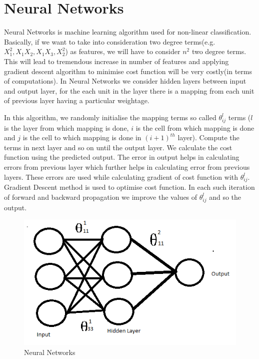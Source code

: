 \section{ Neural Networks}
\par Neural Networks is machine learning algorithm used for non-linear classification. Basically, if we want to take into consideration two degree terms(e.g. $X_{1}^{2},X_{1}X_{2},X_{1}X_{3},X_{2}^{2}$) as features, we will have to consider $n^{2}$ two degree terms. This will lead to tremendous increase in number of features and applying gradient descent algorithm to minimise cost function will be very costly(in terms of computations). In Neural Networks we consider hidden layers between input and output layer, for the each unit in the layer there is a mapping from each unit of previous layer having a particular weightage. ~\cite{maind2014research}
\par In this algorithm, we randomly initialise the mapping terms so called $\theta_{ij}^{l}$ terms ($l$ is the layer from which mapping is done, $i$ is the cell from which mapping is done and $j$ is the cell to which mapping is done in $(i+1)^{th}$ layer). Compute the terms in next layer and so on until the output layer. We calculate the cost function using the predicted output. The error in output helps in calculating errors from previous layer which further helps in calculating error from previous layers. These errors are used while calculating gradient of cost function with $\theta_{ij}^{l}$. Gradient Descent method is used to optimise cost function. In each such iteration of forward and backward propagation we improve the values of $\theta_{ij}^{l}$ and so the output. ~\cite{maind2014research}
\begin{figure}
  \centering
  \includegraphics[scale=1]{Capture.png}
  \caption{Neural Networks}
\end{figure}
